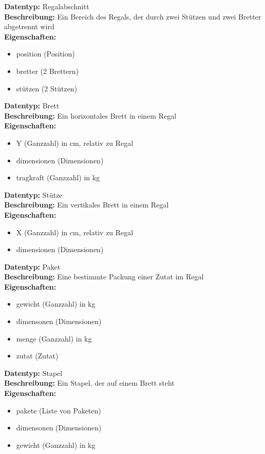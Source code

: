 \bigskip
\textbf{Datentyp:} Regalabschnitt\\
\textbf{Beschreibung:} Ein Bereich des Regals, der durch zwei Stützen und zwei Bretter abgetrennt wird\\
\textbf{Eigenschaften:}
\begin{itemize}
    \setlength\itemsep{0em}
    \item position (Position)
    \item bretter (2 Brettern)
    \item stützen (2 Stützen)
\end{itemize}
\bigskip
\textbf{Datentyp:} Brett\\
\textbf{Beschreibung:} Ein horizontales Brett in einem Regal\\
\textbf{Eigenschaften:}
\begin{itemize}
    \setlength\itemsep{0em}
    \item Y (Ganzzahl) in cm, relativ zu Regal
    \item dimensionen (Dimensionen)
    \item tragkraft (Ganzzahl) in kg
\end{itemize}
\bigskip
\textbf{Datentyp:} Stütze\\
\textbf{Beschreibung:} Ein vertikales Brett in einem Regal\\
\textbf{Eigenschaften:}
\begin{itemize}
    \setlength\itemsep{0em}
    \item X (Ganzzahl) in cm, relativ zu Regal
    \item dimensionen (Dimensionen)
\end{itemize}
\bigskip
\textbf{Datentyp:} Paket\\
\textbf{Beschreibung:} Eine bestimmte Packung einer Zutat im Regal\\
\textbf{Eigenschaften:}
\begin{itemize}
    \setlength\itemsep{0em}
    \item gewicht (Ganzzahl) in kg
    \item dimensonen (Dimensionen)
    \item menge (Ganzzahl) in kg
    \item zutat (Zutat)
\end{itemize}
\bigskip
\textbf{Datentyp:} Stapel\\
\textbf{Beschreibung:} Ein Stapel, der auf einem Brett steht\\
\textbf{Eigenschaften:}
\begin{itemize}
    \setlength\itemsep{0em}
    \item pakete (Liste von Paketen)
    \item dimensonen (Dimensionen)
    \item gewicht (Ganzzahl) in kg
\end{itemize}
